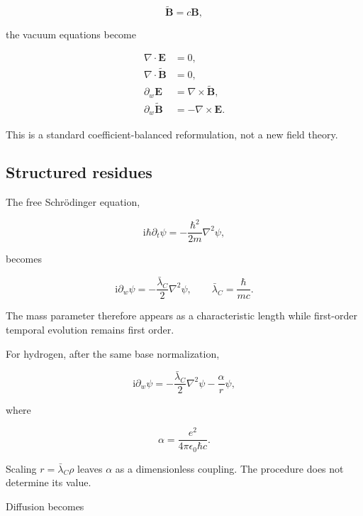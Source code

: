 \documentclass[10pt]{article}
\newcommand{\ii}{\mathrm i}
\newcommand{\grad}{\nabla}
\newcommand{\lap}{\nabla^2}
\newcommand{\lC}{\bar\lambda_{\!C}}
\newcommand{\vect}[1]{\bm{#1}}
\begin{document}
\begin{equation}
  \widetilde{\vect B}=c\vect B ,
\end{equation}

the vacuum equations become

\begin{align}
  \grad\!\cdot\vect E &= 0,\\
  \grad\!\cdot\widetilde{\vect B} &= 0,\\
  \partial_w\vect E &= \grad\!\times\widetilde{\vect B},\\
  \partial_w\widetilde{\vect B} &= -\grad\!\times\vect E.
\end{align}

This is a standard coefficient-balanced reformulation, not a new
field theory.

\subsection{Structured residues}

The free Schr\"odinger equation,

\begin{equation}
  \ii\hbar\partial_t\psi
  =
  -\frac{\hbar^2}{2m}\lap\psi ,
\end{equation}

becomes

\begin{equation}
  \ii\partial_w\psi
  =
  -\frac{\lC}{2}\lap\psi ,
  \qquad
  \lC=\frac{\hbar}{mc}.
  \label{eq:schr}
\end{equation}

The mass parameter therefore appears as a characteristic length while
first-order temporal evolution remains first order.

For hydrogen, after the same base normalization,

\begin{equation}
  \ii\partial_w\psi
  =
  -\frac{\lC}{2}\lap\psi
  -
  \frac{\alpha}{r}\psi ,
\end{equation}

where

\begin{equation}
  \alpha
  =
  \frac{e^2}{4\pi\epsilon_0\hbar c}.
\end{equation}

Scaling \(r=\lC\rho\) leaves \(\alpha\) as a dimensionless coupling.
The procedure does not determine its value.

Diffusion becomes
\end{document}
